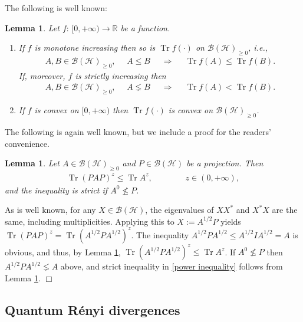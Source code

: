 \documentclass[unsortedaddress,superscriptaddress,pra,notitlepage]{revtex4}
\newtheorem{lemma}[definition]{Lemma}
\newenvironment{proof}[1][Proof]{\begin{trivlist}
\item[\hskip \labelsep {\bfseries #1}]}{\hfill$\Box$\end{trivlist}}
\def\B{{\mathcal B}}
\def\bR{\mathbb{R}}
\def\hil{{\mathcal H}}
\def\imp{\Longrightarrow}
\def\p{_{\ge 0}}
\def\valt{\cdot}
\newcommand{\ds}{\mbox{ }\mbox{ }}
\DeclareMathOperator{\Tr}{Tr}
\begin{document}
The following is well known:
\begin{lemma}\label{lemma:trace functions}
Let $f:\,[0,+\infty)\to\bR$ be a function.
\begin{enumerate}
\item
If $f$ is monotone increasing then 
so is $\Tr f(\valt)$ on $\B(\hil)\p$, i.e., 
\begin{align}\label{trace monotonicity}
A,B\in\B(\hil)\p,\ds A\le B\ds\imp\ds \Tr f(A)\le\Tr f(B).
\end{align}
If, moreover, $f$ is strictly increasing then 
\begin{align}\label{trace monotonicity2}
A,B\in\B(\hil)\p,\ds A\lneq B\ds\imp\ds \Tr f(A)<\Tr f(B).
\end{align}

\item
If $f$ is convex on $[0,+\infty)$ then $\Tr f(\valt)$ is convex on $\B(\hil)\p$.
\end{enumerate}
\end{lemma}

The following is again well known, but we include a proof for the readers' convenience.

\begin{lemma}\label{lemma:power inequality}
Let $A\in\B(\hil)\p$ and $P\in\B(\hil)$ be a projection. Then 
\begin{align}\label{power inequality}
\Tr (PAP)^z\le\Tr A^z,\ds\ds\ds z\in(0,+\infty),
\end{align}
and the inequality is strict if $A^0\nleq P$. 
\end{lemma}
\begin{proof}
As is well known, for any $X\in\B(\hil)$, the eigenvalues of $XX^*$ and $X^*X$ are the same, including multiplicities.
Applying this to $X:=A^{1/2}P$ yields $\Tr (PAP)^z=\Tr (A^{1/2}PA^{1/2})^z$.
The inequality $A^{1/2}PA^{1/2}\le A^{1/2}IA^{1/2}=A$ is obvious, and thus, by Lemma \ref{lemma:trace functions}, 
$\Tr (A^{1/2}PA^{1/2})^z
\le
\Tr A^z$. 
If $A^0\nleq P$ then 
$A^{1/2}PA^{1/2}\lneq A$ above, and strict inequality in 
\eqref{power inequality} follows from Lemma \ref{lemma:trace functions}.
\end{proof}


\subsection{Quantum R\'enyi divergences}
\label{sec:Renyidiv}
\end{document}
